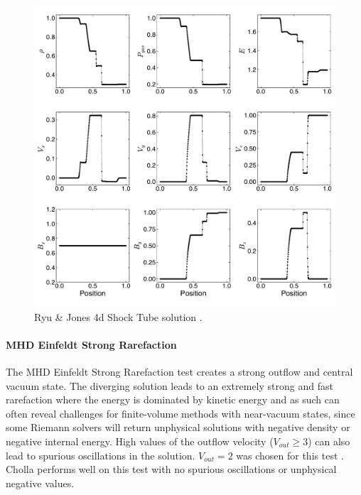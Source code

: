 \begin{figure}[ht!]
    \includegraphics[width=\linewidth]{assets/3-mhd-tests/rj4d.pdf}
    \caption{Ryu \& Jones 4d Shock Tube solution \citep{ryu_jones_1995}.
    }
    \label{fig:rj-4d}
\end{figure}

\paragraph{MHD Einfeldt Strong Rarefaction}

The MHD Einfeldt Strong Rarefaction test \citep{einfeldt_1991} creates a strong outflow and central vacuum state. The diverging solution leads to an extremely strong and fast rarefaction where the energy is dominated by kinetic energy and as such can often reveal challenges for finite-volume methods with near-vacuum states, since some Riemann solvers will return unphysical solutions with negative density or negative internal energy. High values of the outflow velocity ($V_{out}\ge3$) can also lead to spurious oscillations in the solution. $V_{out} = 2$ was chosen for this test \citep{charm_2011}. Cholla performs well on this test with no spurious oscillations or unphysical negative values.

